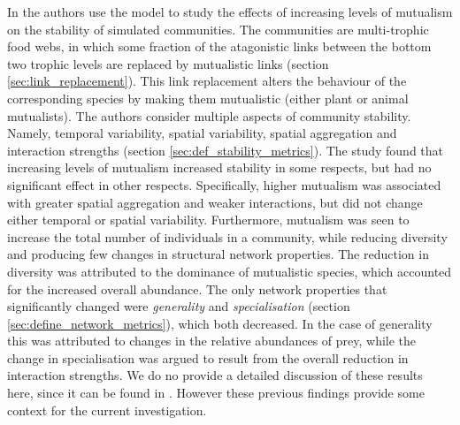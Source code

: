 In \cite{lurgi2015effects} the authors use the model to study the effects of increasing levels of mutualism on the stability of simulated communities. The communities are multi-trophic food webs, in which some fraction of the atagonistic links between the bottom two trophic levels are replaced by mutualistic links (section \ref{sec:link_replacement}). This link replacement alters the behaviour of the corresponding species by making them mutualistic (either plant or animal mutualists). The authors consider multiple aspects of community stability. Namely, temporal variability, spatial variability, spatial aggregation and interaction strengths (section \ref{sec:def_stability_metrics}). The study found that increasing levels of mutualism increased stability in some respects, but had no significant effect in other respects. Specifically, higher mutualism was associated with greater spatial aggregation and weaker interactions, but did not change either temporal or spatial variability. Furthermore, mutualism was seen to increase the total number of individuals in a community, while reducing diversity and producing few changes in structural network properties. The reduction in diversity was attributed to the dominance of mutualistic species, which accounted for the increased overall abundance. The only network properties that significantly changed were \emph{generality} and \emph{specialisation} (section \ref{sec:define_network_metrics}), which both decreased. In the case of generality this was attributed to changes in the relative abundances of prey, while the change in specialisation was argued to result from the overall reduction in interaction strengths. We do no provide a detailed discussion of these results here, since it can be found in \cite{lurgi2015effects}. However these previous findings provide some context for the current investigation.  



